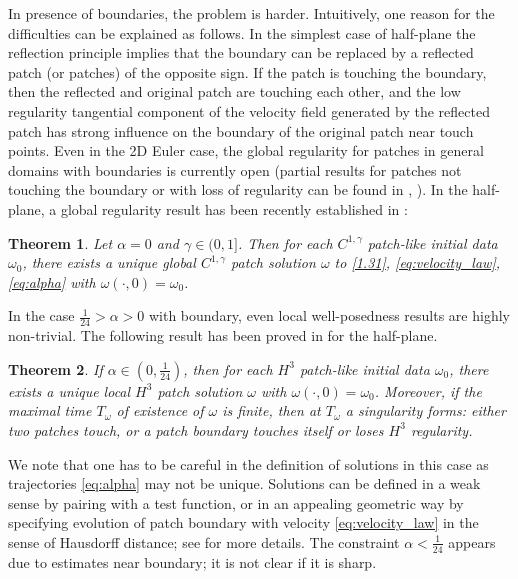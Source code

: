 \documentclass[reqno,centertags, 11pt]{amsart}
\newtheorem{theorem}{Theorem}[section]
\def \Rm {\mathbb R}
\begin{document}
In presence of boundaries, the problem is harder. Intuitively, one reason for the difficulties can be explained as follows. In the simplest case of half-plane the reflection principle
implies that the boundary can be replaced by a reflected patch (or patches) of the opposite sign. If the patch is touching the boundary, then the reflected and original
patch are touching each other, and the low regularity tangential component of the velocity field generated by the reflected patch has strong influence on the boundary of the original patch
near touch points.
Even in the 2D Euler case, the global regularity for patches in general domains with boundaries is currently open (partial results for patches not touching the boundary
or with loss of regularity can be found in \cite{d}, \cite{d2}).
In the half-plane, a global regularity result has been recently established in \cite{KRYZ}:
\begin{theorem}\label{thmeuler1}
Let $\alpha =0$ and $\gamma\in(0,1]$.  Then for each $C^{1,\gamma}$ patch-like initial data
$\omega_0$,  there exists a unique global $C^{1,\gamma}$ patch solution $\omega$ to \eqref{1.31}, \eqref{eq:velocity_law}, \eqref{eq:alpha}
with $\omega(\cdot,0)=\omega_0$.
\end{theorem}
In the case $\frac{1}{24}> \alpha>0$ with boundary, even local well-posedness results are highly non-trivial. The following result has been proved in \cite{KYZ}
for the half-plane.
 \begin{theorem}\label{T.1.1}
If  $\alpha\in(0,\frac 1{24})$, then for each $H^3$ patch-like initial data $\omega_0$,  there exists a unique local $H^3$
patch solution $\omega$ with $\omega(\cdot,0)=\omega_0$.  Moreover, if the maximal time
$T_\omega$ of existence of $\omega$ is finite, then at $T_\omega$ a singularity forms: either two patches touch, or a patch boundary touches
itself or  loses $H^3$ regularity.
\end{theorem}
We note that one has to be careful in the definition of solutions in this case as trajectories \eqref{eq:alpha} may not be unique.
Solutions can be defined in a weak sense by pairing with a test function, or in an appealing geometric way by specifying evolution
of patch boundary with velocity \eqref{eq:velocity_law} in the sense of Hausdorff distance; see \cite{KYZ} for more details.
The constraint $\alpha < \frac{1}{24}$ appears due to estimates near boundary; it is not clear if it is sharp.
\end{document}
